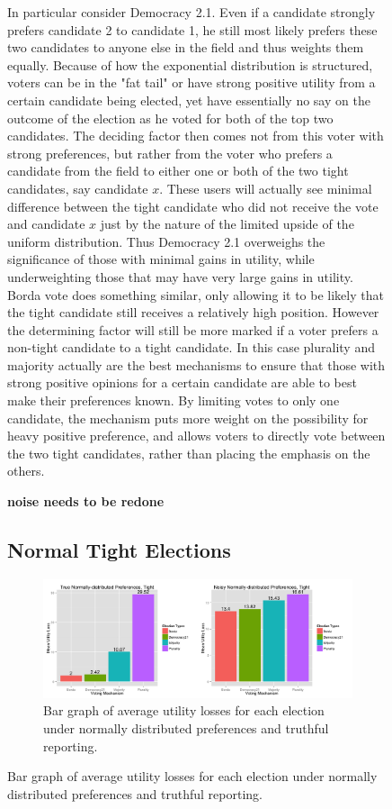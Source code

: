 \documentclass[11pt]{scrartcl}
\begin{document}
\begin{figure}[H]
In particular consider Democracy 2.1. Even if a candidate strongly prefers candidate 2 to candidate 1, he still most likely prefers these two candidates to anyone else in the field and thus weights them equally.  Because of how the exponential distribution is structured, voters can be in the "fat tail" or have strong positive utility from a certain candidate being elected, yet have essentially no say on the outcome of the election as he voted for both of the top two candidates. The deciding factor then comes not from this voter with strong preferences, but rather from the voter who prefers a candidate from the field to either one or both of the two tight candidates, say candidate $x$. These users will actually see minimal difference between the tight candidate who did not receive the vote and candidate $x$ just by the nature of the limited upside of the uniform distribution. Thus Democracy 2.1 overweighs the significance of those with minimal gains in utility, while underweighting those that may have very large gains in utility.\\

Borda vote does something similar, only allowing it to be likely that the tight candidate still receives a relatively high position. However the determining factor will still be more marked if a voter prefers a non-tight candidate to a tight candidate. In this case plurality and majority actually are the best mechanisms to ensure that those with strong positive opinions for a certain candidate are able to best make their preferences known. By limiting votes to only one candidate, the mechanism puts more weight on the possibility for heavy positive preference, and allows voters to directly vote between the two tight candidates, rather than placing the emphasis on the others.


\textbf{noise needs to be redone}


\subsection{Normal Tight Elections}

\begin{figure}[H]\center
\includegraphics[scale=0.38]{normal_tight.png}
\caption{Bar graph of average utility losses for each election under normally distributed preferences and truthful reporting.}
\end{figure}


\end{figure}
\end{document}
